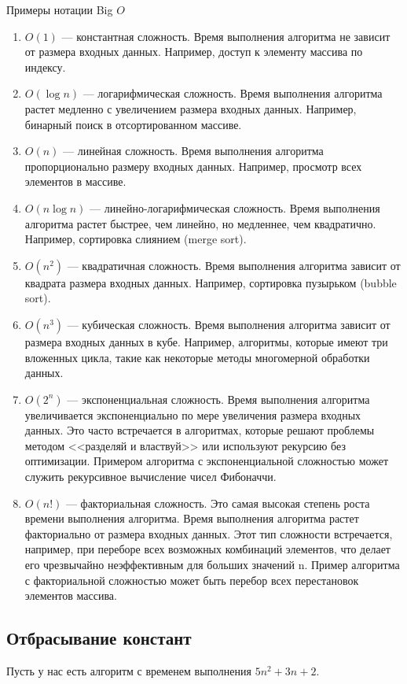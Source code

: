 Примеры нотации Big $O$
\begin{enumerate}
    \item $O(1)$ --- константная сложность. Время выполнения алгоритма не зависит от размера входных данных.
          Например, доступ к элементу массива по индексу.
    \item $O(\log{n})$ --- логарифмическая сложность. Время выполнения алгоритма растет
          медленно с увеличением размера входных данных. Например, бинарный поиск в отсортированном массиве.
    \item $O(n)$ --- линейная сложность. Время выполнения алгоритма пропорционально размеру входных данных.
          Например, просмотр всех элементов в массиве.
    \item $O(n\log{n})$ --- линейно-логарифмическая сложность. Время выполнения алгоритма растет быстрее,
          чем линейно, но медленнее, чем квадратично. Например, сортировка слиянием (merge sort).
    \item $O(n^2)$ --- квадратичная сложность. Время выполнения алгоритма зависит от квадрата размера входных данных. Например, сортировка пузырьком (bubble sort).
    \item $O(n^3)$ --- кубическая сложность. Время выполнения алгоритма зависит от размера входных данных в кубе. Например, алгоритмы, которые имеют три вложенных цикла, такие как некоторые методы многомерной обработки данных.
    \item $O(2^n)$ --- экспоненциальная сложность. Время выполнения алгоритма 
          увеличивается экспоненциально по мере увеличения размера входных данных. 
          Это часто встречается в алгоритмах, которые решают проблемы методом 
          <<разделяй и властвуй>> или используют рекурсию без оптимизации. Примером 
          алгоритма с экспоненциальной сложностью может служить рекурсивное 
          вычисление чисел Фибоначчи.
    \item $O(n!)$ --- факториальная сложность. Это самая высокая степень 
          роста времени выполнения алгоритма. Время выполнения алгоритма растет 
          факториально от размера входных данных. Этот тип сложности встречается, 
          например, при переборе всех возможных комбинаций элементов, что делает 
          его чрезвычайно неэффективным для больших значений n. Пример алгоритма с 
          факториальной сложностью может быть перебор всех перестановок элементов 
          массива.
\end{enumerate}

\subsection{Отбрасывание констант}
Пусть у нас есть алгоритм с временем выполнения $5n^2 + 3n + 2$.

